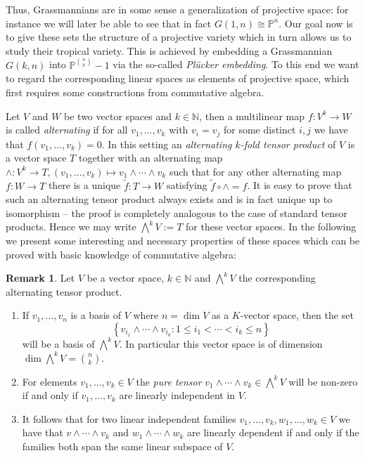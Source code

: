 \documentclass[
  paper=a4,
  titlepage,
  bibliography=totoc,
  listof=totoc,
  pagesize=pdftex
]{scrartcl}
\numberwithin{figure}{section}
\numberwithin{equation}{section}
\numberwithin{table}{section}
\newcommand*\setN{\mathds{N}}
\newcommand*\setP{\mathds{P}}
\theoremstyle{definition}
\newtheorem{remark}[definition]{Remark}
\numberwithin{definition}{section}
\begin{document}
Thus, Grassmannians are in some sense a generalization of projective space: for instance
we will later be able to see that in fact $G(1,n) \cong \setP^n$. Our goal now is to give
these sets the structure of a projective variety which in turn allows us to study their
tropical variety. This is achieved by embedding a Grassmannian $G(k, n)$ into
$\setP^{\binom nk}-1$ via the so-called \emph{Plücker embedding}. To this end we want to
regard the corresponding linear spaces as elements of projective space, which first
requires some constructions from commutative algebra.

Let $V$ and $W$ be two vector spaces and $k\in\setN$, then a multilinear map $f : V^k \to
W$ is called \emph{alternating} if for all $v_1, \dots, v_k$ with $v_i=v_j$ for some
distinct $i,j$ we have that $f(v_1, \dots, v_k) = 0$. In this setting an \emph{alternating
$k$-fold tensor product} of $V$ is a vector space $T$ together with an alternating map
$\wedge:V^k\to T, (v_1, \dots, v_k) \mapsto v_1\wedge\cdots\wedge v_k$ such that for any
other alternating map $f:W\to T$ there is a unique $\tilde f:T\to W$ satisfying $\tilde f
\circ \wedge = f$. It is easy to prove that such an alternating tensor product always
exists and is in fact unique up to isomorphism -- the proof is completely analogous to the
case of standard tensor products. Hence we may write $\bigwedge^k V := T$ for these vector
spaces. In the following we present some interesting and necessary properties of these
spaces which can be proved with basic knowledge of commutative algebra:

\begin{remark}
  Let $V$ be a vector space, $k \in \setN$ and $\bigwedge^k V$ the corresponding
  alternating tensor product.
  \begin{enumerate}
    \item If $v_1, \dots, v_n$ is a basis of $V$ where $n=\dim V$ as a $K$-vector space,
      then the set
      \[
        \left\{
          v_{i_1} \wedge \cdots \wedge v_{i_k} : 1\leq i_1 < \cdots < i_k \leq n
        \right\}
      \]
      will be a basis of $\bigwedge^kV$. In particular this vector space is of dimension
      $\dim\bigwedge^kV = \binom nk$.
    \item For elements $v_1, \dots, v_k \in V$ the \emph{pure tensor} $v_1\wedge \cdots
      \wedge v_k \in \bigwedge^kV$ will be non-zero if and only if $v_1, \dots, v_k$ are
      linearly independent in $V$.
    \item It follows that for two linear independent families $v_1, \dots, v_k, w_1,
      \dots, w_k \in V$ we have that $v\wedge\cdots \wedge v_k$ and $w_1\wedge\cdots\wedge
      w_k$ are linearly dependent if and only if the families both span the same linear
      subspace of $V$.
  \end{enumerate}
\end{remark}
\end{document}
